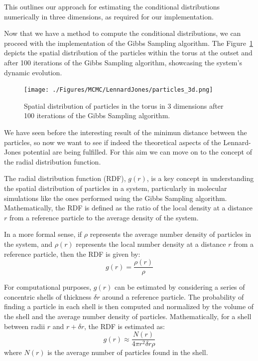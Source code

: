 \documentclass{report}
\begin{document}
This outlines our approach for estimating the conditional distributions numerically in three dimensions, as required for our implementation.

Now that we have a method to compute the conditional distributions, we can proceed with the implementation of the Gibbs Sampling algorithm. The Figure~\ref{fig:particlesmh2} depicts the spatial distribution of the particles within the torus at the outset and after 100 iterations of the Gibbs Sampling algorithm, showcasing the system's dynamic evolution.

\begin{figure}[H]
	\centering
	\texttt{[image: ./Figures/MCMC/LennardJones/particles\_3d.png]}
	\caption{Spatial distribution of particles in the torus in 3 dimensions after 100 iterations of the Gibbs Sampling algorithm.}
	\label{fig:particlesmh2}
\end{figure}

We have seen before the interesting result of the minimun distance between the particles, so now we want to see if indeed the theoretical aspects of the Lennard-Jones potential are being fulfilled. For this aim we can move on to the concept of the radial distribution function. 

The radial distribution function (RDF), \( g(r) \), is a key concept in understanding the spatial distribution of particles in a system, particularly in molecular simulations like the ones performed using the Gibbs Sampling algorithm. Mathematically, the RDF is defined as the ratio of the local density at a distance \( r \) from a reference particle to the average density of the system. 

In a more formal sense, if \( \rho \) represents the average number density of particles in the system, and \( \rho(r) \) represents the local number density at a distance \( r \) from a reference particle, then the RDF is given by:
\[ g(r) = \frac{\rho(r)}{\rho} \]

For computational purposes, \( g(r) \) can be estimated by considering a series of concentric shells of thickness \( \delta r \) around a reference particle. The probability of finding a particle in each shell is then computed and normalized by the volume of the shell and the average number density of particles. Mathematically, for a shell between radii \( r \) and \( r + \delta r \), the RDF is estimated as:
\[ g(r) \approx \frac{N(r)}{4\pi r^2 \delta r \rho} \]
where \( N(r) \) is the average number of particles found in the shell.
\end{document}
